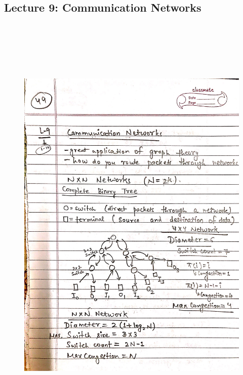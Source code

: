 \newpage
{\color{black} \subsection*{Lecture 9: Communication Networks}}
\begin{figure}[H]
    \centering
    \includegraphics[width=16cm, height=21cm]{"./MIT-6.042J/MIT-6042J-049"}
\end{figure}

